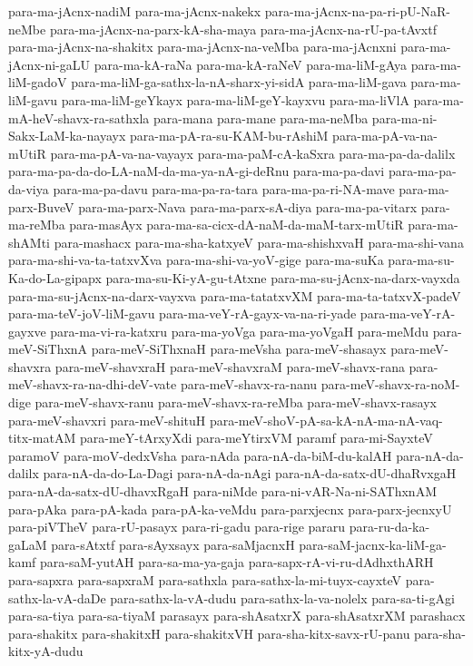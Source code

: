 {para-ma-jAcnx-nadiM
para-ma-jAcnx-nakekx
para-ma-jAcnx-na-pa-ri-pU-NaR-neMbe
para-ma-jAcnx-na-parx-kA-sha-maya
para-ma-jAcnx-na-rU-pa-tAvxtf
para-ma-jAcnx-na-shakitx
para-ma-jAcnx-na-veMba
para-ma-jAcnxni
para-ma-jAcnx-ni-gaLU
para-ma-kA-raNa
para-ma-kA-raNeV
para-ma-liM-gAya
para-ma-liM-gadoV
para-ma-liM-ga-sathx-la-nA-sharx-yi-sidA
para-ma-liM-gava
para-ma-liM-gavu
para-ma-liM-geYkayx
para-ma-liM-geY-kayxvu
para-ma-liVlA
para-ma-mA-heV-shavx-ra-sathxla
para-mana
para-mane
para-ma-neMba
para-ma-ni-Sakx-LaM-ka-nayayx
para-ma-pA-ra-su-KAM-bu-rAshiM
para-ma-pA-va-na-mUtiR
para-ma-pA-va-na-vayayx
para-ma-paM-cA-kaSxra
para-ma-pa-da-dalilx
para-ma-pa-da-do-LA-naM-da-ma-ya-nA-gi-deRnu
para-ma-pa-davi
para-ma-pa-da-viya
para-ma-pa-davu
para-ma-pa-ra-tara
para-ma-pa-ri-NA-mave
para-ma-parx-BuveV
para-ma-parx-Nava
para-ma-parx-sA-diya
para-ma-pa-vitarx
para-ma-reMba
para-masAyx
para-ma-sa-cicx-dA-naM-da-maM-tarx-mUtiR
para-ma-shAMti
para-mashacx
para-ma-sha-katxyeV
para-ma-shishxvaH
para-ma-shi-vana
para-ma-shi-va-ta-tatxvXva
para-ma-shi-va-yoV-gige
para-ma-suKa
para-ma-su-Ka-do-La-gipapx
para-ma-su-Ki-yA-gu-tAtxne
para-ma-su-jAcnx-na-darx-vayxda
para-ma-su-jAcnx-na-darx-vayxva
para-ma-tatatxvXM
para-ma-ta-tatxvX-padeV
para-ma-teV-joV-liM-gavu
para-ma-veY-rA-gayx-va-na-ri-yade
para-ma-veY-rA-gayxve
para-ma-vi-ra-katxru
para-ma-yoVga
para-ma-yoVgaH
para-meMdu
para-meV-SiThxnA
para-meV-SiThxnaH
para-meVsha
para-meV-shasayx
para-meV-shavxra
para-meV-shavxraH
para-meV-shavxraM
para-meV-shavx-rana
para-meV-shavx-ra-na-dhi-deV-vate
para-meV-shavx-ra-nanu
para-meV-shavx-ra-noM-dige
para-meV-shavx-ranu
para-meV-shavx-ra-reMba
para-meV-shavx-rasayx
para-meV-shavxri
para-meV-shituH
para-meV-shoV-pA-sa-kA-nA-ma-nA-vaq-titx-matAM
para-meY-tArxyXdi
para-meYtirxVM
paramf
para-mi-SayxteV
paramoV
para-moV-dedxVsha
para-nAda
para-nA-da-biM-du-kalAH
para-nA-da-dalilx
para-nA-da-do-La-Dagi
para-nA-da-nAgi
para-nA-da-satx-dU-dhaRvxgaH
para-nA-da-satx-dU-dhavxRgaH
para-niMde
para-ni-vAR-Na-ni-SAThxnAM
para-pAka
para-pA-kada
para-pA-ka-veMdu
para-parxjecnx
para-parx-jecnxyU
para-piVTheV
para-rU-pasayx
para-ri-gadu
para-rige
pararu
para-ru-da-ka-gaLaM
para-sAtxtf
para-sAyxsayx
para-saMjacnxH
para-saM-jacnx-ka-liM-ga-kamf
para-saM-yutAH
para-sa-ma-ya-gaja
para-sapx-rA-vi-ru-dAdhxthARH
para-sapxra
para-sapxraM
para-sathxla
para-sathx-la-mi-tuyx-cayxteV
para-sathx-la-vA-daDe
para-sathx-la-vA-dudu
para-sathx-la-va-nolelx
para-sa-ti-gAgi
para-sa-tiya
para-sa-tiyaM
parasayx
para-shAsatxrX
para-shAsatxrXM
parashacx
para-shakitx
para-shakitxH
para-shakitxVH
para-sha-kitx-savx-rU-panu
para-sha-kitx-yA-dudu
}
